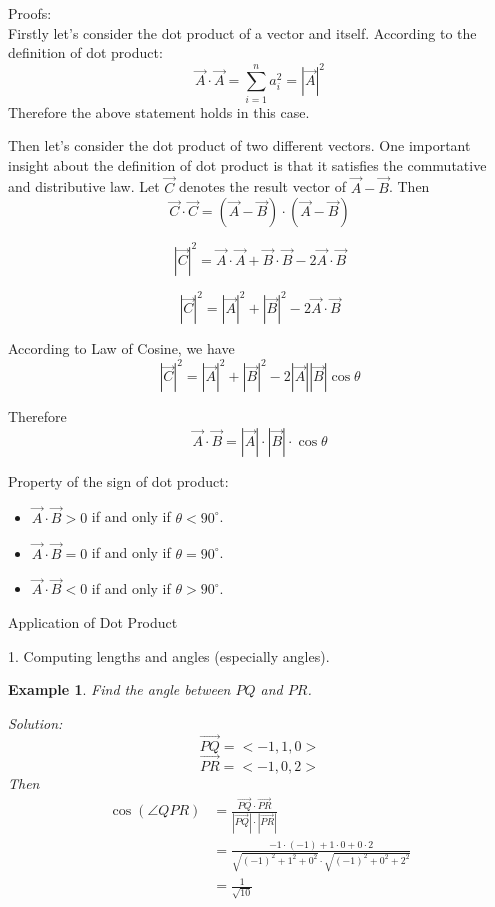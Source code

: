 \documentclass{article}
\newtheorem{example}{Example}
\begin{document}
Proofs:\\
Firstly let's consider the dot product of a vector and itself. According to the
definition of dot product:
\[ \vec{A} \cdot \vec{A} = \sum_{i=1}^{n}a_{i}^2 = |\vec{A}|^2 \]
Therefore the above statement holds in this case.

Then let's consider the dot product of two different vectors. One important
insight about the definition of dot product is that it satisfies the commutative
and distributive law. Let $\vec{C}$ denotes the result vector of
$\vec{A} - \vec{B}$. Then
\[ \vec{C} \cdot \vec{C} = (\vec{A} - \vec{B}) \cdot (\vec{A} - \vec{B}) \]

\[ |\vec{C}|^2 = \vec{A} \cdot \vec{A} + \vec{B} \cdot \vec{B} - 2 \vec{A} \cdot \vec{B} \]

\[ |\vec{C}|^2 = |\vec{A}|^2 + |\vec{B}|^2 - 2 \vec{A} \cdot \vec{B} \]

According to Law of Cosine, we have
\[ |\vec{C}|^2 = |\vec{A}|^2 + |\vec{B}|^2 - 2|\vec{A}||\vec{B}|\cos\theta \]

Therefore
\[ \vec{A} \cdot \vec{B} = |\vec{A}| \cdot |\vec{B}| \cdot \cos\theta \]

\bigskip

Property of the sign of dot product:
\begin{itemize}
	\item $\vec{A} \cdot \vec{B} > 0$ if and only if $\theta < 90^{\circ}$.
	\item $\vec{A} \cdot \vec{B} = 0$ if and only if $\theta = 90^{\circ}$.
	\item $\vec{A} \cdot \vec{B} < 0$ if and only if $\theta > 90^{\circ}$.
\end{itemize}

\bigskip
Application of Dot Product

1. Computing lengths and angles (especially angles).

\begin{example}
Find the angle between $PQ$ and $PR$.

Solution:
\[ \vec{PQ} = <-1, 1, 0> \]
\[ \vec{PR} = < -1, 0, 2> \]
Then
\[ 
  \begin{split}
	\cos(\angle QPR)  &= \frac{\vec{PQ} \cdot \vec{PR}}{|\vec{PQ}| \cdot |\vec{PR}|} \\
	                  &= \frac{-1 \cdot (-1) + 1 \cdot 0 + 0 \cdot 2}{\sqrt{(-1)^{2} + 1^{2} + 0^{2}} \cdot \sqrt{(-1)^{2} + 0^{2} + 2^{2}}} \\
	                  &= \frac{1}{\sqrt{10}}
  \end{split}
\]
\end{example}
\end{document}
